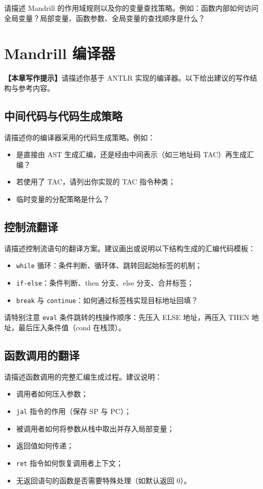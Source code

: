 \documentclass[12pt,hyperref,a4paper,UTF8]{ctexart}
\begin{document}
请描述 Mandrill 的作用域规则以及你的变量查找策略。例如：函数内部如何访问全局变量？局部变量、函数参数、全局变量的查找顺序是什么？

\section{Mandrill 编译器}

\textbf{【本章写作提示】}请描述你基于 ANTLR 实现的编译器。以下给出建议的写作结构与参考内容。

\subsection{中间代码与代码生成策略}

请描述你的编译器采用的代码生成策略。例如：
\begin{itemize}
    \item 是直接由 AST 生成汇编，还是经由中间表示（如三地址码 TAC）再生成汇编？
    \item 若使用了 TAC，请列出你实现的 TAC 指令种类；
    \item 临时变量的分配策略是什么？
\end{itemize}

\subsection{控制流翻译}

请描述控制流语句的翻译方案。建议画出或说明以下结构生成的汇编代码模板：
\begin{itemize}
    \item \texttt{while} 循环：条件判断、循环体、跳转回起始标签的机制；
    \item \texttt{if-else}：条件判断、then 分支、else 分支、合并标签；
    \item \texttt{break} 与 \texttt{continue}：如何通过标签栈实现目标地址回填？
\end{itemize}

请特别注意 \texttt{eval} 条件跳转的栈操作顺序：先压入 ELSE 地址，再压入 THEN 地址，最后压入条件值（cond 在栈顶）。

\subsection{函数调用的翻译}

请描述函数调用的完整汇编生成过程。建议说明：
\begin{itemize}
    \item 调用者如何压入参数；
    \item \texttt{jal} 指令的作用（保存 SP 与 PC）；
    \item 被调用者如何将参数从栈中取出并存入局部变量；
    \item 返回值如何传递；
    \item \texttt{ret} 指令如何恢复调用者上下文；
    \item 无返回语句的函数是否需要特殊处理（如默认返回 0）。
\end{itemize}
\end{document}
